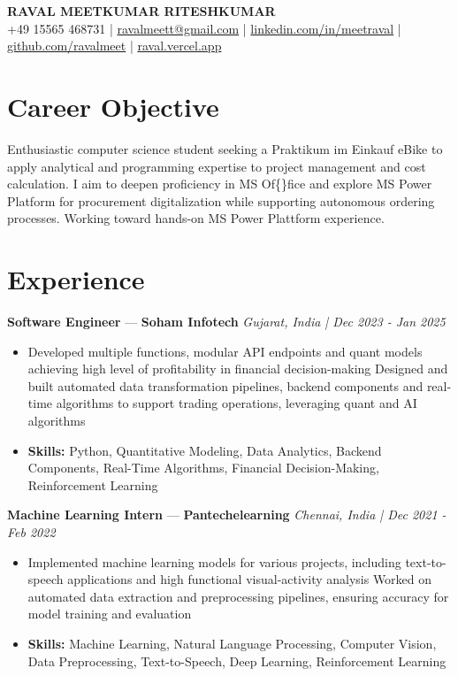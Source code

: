 \documentclass[a4paper,10pt]{article}
\begin{document}
\begin{center}
  {\Large\bfseries RAVAL MEETKUMAR RITESHKUMAR}\\[2pt]
  {\small +49 15565 468731 \;|\; \href{mailto:ravalmeett@gmail.com}{ravalmeett@gmail.com} \;|\; \href{https://www.linkedin.com/in/meetraval/}{linkedin.com/in/meetraval} \;|\; \href{https://github.com/ravalmeet}{github.com/ravalmeet} \;|\; \href{https://raval.vercel.app/}{raval.vercel.app}}
\end{center}
\vspace{-3pt}

\section*{Career Objective}
Enthusiastic computer science student seeking a Praktikum im Einkauf eBike to apply analytical and programming expertise to project management and cost calculation. I aim to deepen proficiency in MS Of\{\}fice and explore MS Power Platform for procurement digitalization while supporting autonomous ordering processes. Working toward hands-on MS Power Plattform experience.\par

\section*{Experience}
\textbf{Software Engineer} — \textbf{Soham Infotech} \hfill \textit{Gujarat, India \;|\; Dec 2023 - Jan 2025}\par
\vspace{1pt}
\begin{itemize}
  \item Developed multiple functions, modular API endpoints and quant models achieving high level of profitability in financial decision-making Designed and built automated data transformation pipelines, backend components and real-time algorithms to support trading operations, leveraging quant and AI algorithms
  \item \textbf{Skills:} Python, Quantitative Modeling, Data Analytics, Backend Components, Real-Time Algorithms, Financial Decision-Making, Reinforcement Learning
\end{itemize}
\vspace{3pt}
\textbf{Machine Learning Intern} — \textbf{Pantechelearning} \hfill \textit{Chennai, India \;|\; Dec 2021 - Feb 2022}\par
\vspace{1pt}
\begin{itemize}
  \item Implemented machine learning models for various projects, including text-to-speech applications and high functional visual-activity analysis Worked on automated data extraction and preprocessing pipelines, ensuring accuracy for model training and evaluation
  \item \textbf{Skills:} Machine Learning, Natural Language Processing, Computer Vision, Data Preprocessing, Text-to-Speech, Deep Learning, Reinforcement Learning
\end{itemize}
\end{document}
